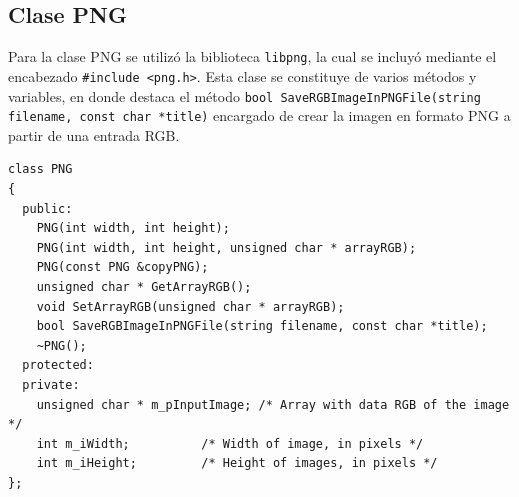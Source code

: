 \subsection{Clase PNG}

Para la clase PNG se utilizó la biblioteca \texttt{libpng}, la cual se incluyó mediante el encabezado \texttt{\#include <png.h>}. Esta clase se constituye de varios métodos y variables, en donde destaca el método \texttt{bool SaveRGBImageInPNGFile(string filename, const char *title)} encargado de crear la imagen en formato PNG a partir de una entrada RGB.

\begin{verbatim}
class PNG
{
  public:
    PNG(int width, int height);
    PNG(int width, int height, unsigned char * arrayRGB);
    PNG(const PNG &copyPNG);
    unsigned char * GetArrayRGB();
    void SetArrayRGB(unsigned char * arrayRGB);
    bool SaveRGBImageInPNGFile(string filename, const char *title);
    ~PNG();
  protected:
  private:
    unsigned char * m_pInputImage; /* Array with data RGB of the image */
    int m_iWidth;          /* Width of image, in pixels */
    int m_iHeight;         /* Height of images, in pixels */
};
\end{verbatim}

